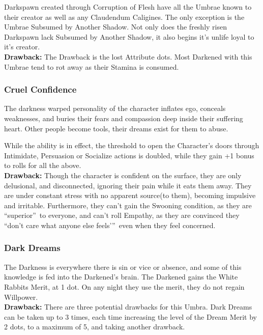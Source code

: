 Darkspawn created through Corruption of Flesh have all the Umbrae known to their creator as well as any Claudendum Caligines. The only exception is the Umbrae Subsumed by Another Shadow. Not only does the freshly risen Darkspawn lack Subsumed by Another Shadow, it also begins it's unlife loyal to it's creator. \\

\noindent \textbf{Drawback:} The Drawback is the lost Attribute dots. Most Darkened with this Umbrae tend to rot away as their Stamina is consumed.

\subsubsection*{Cruel Confidence}

The darkness warped personality of the character inflates ego, conceals weaknesses, and buries their fears and compassion deep inside their suffering heart. Other people become tools, their dreams exist for them to abuse.

While the ability is in effect, the threshold to open the Character’s doors through Intimidate, Persuasion or Socialize actions is doubled, while they gain +1 bonus to rolls for all the above.\\

\noindent \textbf{Drawback:} Though the character is confident on the surface, they are only delusional, and disconnected, ignoring their pain while it eats them away. They are under constant stress with no apparent source(to them), becoming impulsive and irritable. Furthermore, they can’t gain the Swooning condition, as they are \textquotedblleft superior\textquotedblright\, to everyone, and can’t roll Empathy, as they are convinced they \textquotedblleft don’t care what anyone else feels’\textquotedblright\, even when they feel concerned.

\subsubsection*{Dark Dreams}
The Darkness is everywhere there is sin or vice or absence, and some of this knowledge is fed into the Darkened's brain. The Darkened gains the White Rabbits Merit, at 1 dot. On any night they use the merit, they do not regain Willpower. \\

\noindent \textbf{Drawback:} There are three potential drawbacks for this Umbra. Dark Dreams can be taken up to 3 times, each time increasing the level of the Dream Merit by 2 dots, to a maximum of 5, and taking another drawback.

